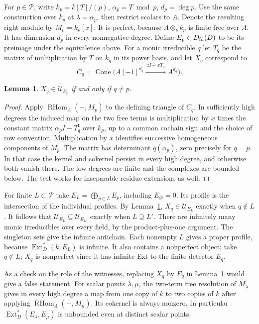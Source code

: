 \documentclass[11pt]{article}
\newtheorem{lem}[thm]{Lemma}
\newcommand{\Dfd}{D_{\rm fd}}
\newcommand{\UU}{\mathcal U}
\newcommand{\Ext}{\operatorname{Ext}}
\newcommand{\Cone}{\operatorname{Cone}}
\newcommand{\RHom}{\operatorname{RHom}}
\begin{document}
For $p\in\mathcal P$, write $k_p=k[T]/(p)$, $\alpha_p=T\bmod p$,
$d_p=\deg p$. Use the same construction over $k_p$ at $\lambda=\alpha_p$,
then restrict scalars to $A$. Denote the resulting right module by
$M_p=k_p[x]$. It is perfect, because $A\otimes_k k_p$ is finite free over
$A$. It has dimension $d_p$ in every nonnegative degree. Define
$E_p\in\Dfd(D)$ to be its preimage under the equivalence above.
For a monic irreducible $q$ let $T_q$ be the matrix of multiplication by
$T$ on $k_q$ in its power basis, and let $X_q$ correspond to
\[
 C_q=\Cone\big(A[-1]^{d_q}
         \xrightarrow{\ z I-xT_q\ } A^{d_q}\big).
\]

\begin{lem}\label{incidence}
$X_q\in\UU_{E_p}$ if and only if $q\ne p$.
\end{lem}
\begin{proof}
Apply $\RHom_A(-,M_p)$ to the defining triangle of $C_q$. In sufficiently
high degrees the induced map on the two free terms is multiplication by
$x$ times the constant matrix $\alpha_p I-T_q^{\mathsf t}$ over $k_p$,
up to a common cochain sign and the choice of row convention. Multiplication
by $x$ identifies successive homogeneous components of $M_p$. The matrix
has determinant $q(\alpha_p)$, zero precisely for $q=p$. In that case
the kernel and cokernel persist in every high degree, and otherwise both
vanish there. The low degrees are finite and the complexes are bounded
below. The test works for inseparable residue extensions as well.
\end{proof}

For finite $L\subset\mathcal P$ take $E_L=\bigoplus_{p\in L}E_p$,
including $E_{\varnothing}=0$. Its profile is the intersection of the
individual profiles. By Lemma~\ref{incidence}, $X_q\in\UU_{E_L}$ exactly
when $q\notin L$. It follows that $\UU_{E_L}\subseteq\UU_{E_{L'}}$
exactly when $L\supseteq L'$. There are infinitely many monic irreducibles
over every field, by the product-plus-one argument. The singleton sets
give the infinite antichain. Each nonempty $L$ gives a proper profile,
because $\Ext_D^*(k,E_L)$ is infinite. It also contains a nonperfect
object: take $q\notin L$; $X_q$ is nonperfect since it has infinite Ext
to the finite detector $E_q$.

As a check on the role of the witnesses, replacing $X_q$ by $E_q$ in
Lemma~\ref{incidence} would give a false statement. For scalar points
$\lambda,\mu$, the two-term free resolution of $M_\lambda$ gives in
every high degree a map from one copy of $k$ to two copies of $k$ after
applying $\RHom_A(-,M_\mu)$. Its cokernel is always nonzero. In particular
$\Ext_D^*(E_\lambda,E_\mu)$ is unbounded even at distinct scalar points.
\end{document}
